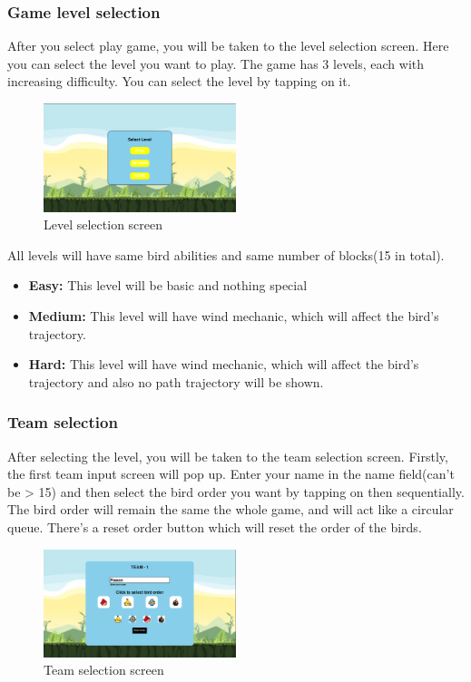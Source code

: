 \documentclass[10pt]{article}
\begin{document}
\subsubsection{Game level selection}
After you select play game, you will be taken to the level selection screen. Here you can select the level you want to play. The game has 3 levels, each with increasing difficulty. You can select the level by tapping on it.

\begin{figure}[h!]
    \centering
    \includegraphics[width=0.5\textwidth]{assets/instruction-images/image0.png}
    \caption{Level selection screen}
    \label{fig:level-selection}
\end{figure}

All levels will have same bird abilities and same number of blocks(15 in total).
\begin{itemize}
    \item \textbf{Easy:} This level will be basic and nothing special
    \item \textbf{Medium:} This level will have wind mechanic, which will affect the bird's trajectory.
    \item \textbf{Hard:} This level will have wind mechanic, which will affect the bird's trajectory and also no path trajectory will be shown.
\end{itemize}


\subsubsection{Team selection}
After selecting the level, you will be taken to the team selection screen. 
Firstly, the first team input screen will pop up. Enter your name in the name field(can't be > 15) and then select the bird order you want by tapping on then sequentially.
The bird order will remain the same the whole game, and will act like a circular queue. There's a reset order button which will reset the order of the birds.

\begin{figure}[h!]
    \centering
    \includegraphics[width=0.5\textwidth]{assets/instruction-images/image1.png}
    \caption{Team selection screen}
    \label{fig:team-selection}
\end{figure}
\end{document}
